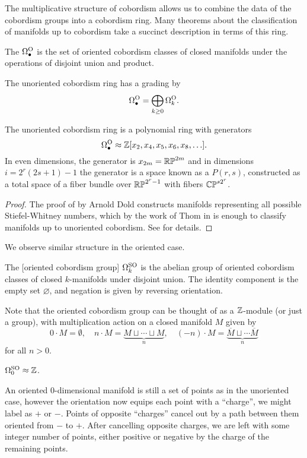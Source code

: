 The multiplicative structure of cobordism allows us to combine the data of the cobordism groups into a cobordism ring. Many theorems about the classification of manifolds up to cobordism take a succinct description in terms of this ring.

\begin{definition}
	The  $\Omega^{\mathrm{O}}_\bullet$ is the set of oriented cobordism classes of closed manifolds under the operations of disjoint union and product.
\end{definition}

The unoriented cobordism ring has a grading by
\[
	\Omega_\bullet^{\mathrm{O}} = \bigoplus_{k\geq 0} \Omega^{\mathrm{O}}_k.
\]

\begin{theorem}[Dold]
	The unoriented cobordism ring is a polynomial ring with generators
	\[
		\Omega^{\mathrm{O}}_\bullet \approx \mathbb{Z}[x_2, x_4, x_5, x_6, x_8,\ldots].
	\]
	In even dimensions, the generator is $x_{2m}=\mathbb{RP}^{2m}$ and in dimensions $i=2^r(2s+1)-1$ the generator is a space known as a  $P(r,s)$, constructed as a total space of a fiber bundle over $\mathbb{RP}^{2^r-1}$ with fibers $\mathbb{CP}^{s2^r}$.
\end{theorem}
\begin{proof}
	The proof of by Arnold Dold constructs manifolds representing all possible Stiefel-Whitney numbers, which by the work of Thom in \cite{thom1954} is enough to classify manifolds up to unoriented cobordism. See \cite{dold1956} for details.
\end{proof}

We observe similar structure in the oriented case.

\begin{definition}
	The [oriented cobordism group] $\Omega^{\mathrm{SO}}_k$ is the abelian group of oriented cobordism classes of closed $k$-manifolds
	under disjoint union. The identity component is the empty set $\varnothing$, and negation is given by reversing orientation. 
\end{definition}

Note that the oriented cobordism group can be thought of as a $\mathbb{Z}$-module (or just a group), with multiplication action on a closed manifold $M$ given by
\[
	0\cdot M = \emptyset, \quad n \cdot M = \underbrace{M\sqcup \cdots \sqcup M}_{n}, \quad (-n)\cdot M = \underbrace{\overline{M}\sqcup \cdots \overline{M}}_n
\]
for all $n>0$.

\begin{example}
	$\Omega_0^{\mathrm{SO}} \approx \mathbb{Z}$. 

	An oriented 0-dimensional manifold is still a set of points as in the unoriented case, however the orientation now equips each point with a ``charge'', we might label as $+$ or $-$. Points of opposite ``charges'' cancel out by a path between them oriented from $-$ to $+$. After cancelling opposite charges, we are left with some integer number of points, either positive or negative by the charge of the remaining points.
\end{example}


